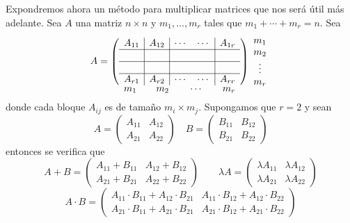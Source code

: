 \begin{obs}
Expondremos ahora un método para multiplicar matrices que nos será útil más adelante. Sea $A$ una matriz $n \times n$ y $m_1, \ldots, m_r$ tales que $m_1+\cdots+m_r=n$. Sea 
$$A=\underset{\mathlarger{\mathlarger{m_1 \qquad m_2 \qquad \cdots \qquad m_r}}}{\left(\begin{array}{c | c | cc | c}
    A_{11} & A_{12} & \cdots & \cdots & A_{1r} \\
    \hline &&&& \\
    \hline &&&&\\
    \hline A_{r1} & A_{r2} & \cdots & \cdots & A_{rr} 
\end{array}\right)}\begin{array}{c}
     m_1  \\
     m_2 \\
     \vdots \\
     m_r
\end{array}$$
donde cada bloque $A_{ij}$ es de tamaño $m_i\times m_j$. Supongamos que $r=2$ y sean 
$$A=\left(\begin{array}{c|c}
   A_{11}  &A_{12}  \\
   \hline
   A_{21}  & A_{22}
\end{array}\right)\quad
B=\left(\begin{array}{c|c}
   B_{11}  &B_{12}  \\
   \hline
   B_{21}  & B_{22}
\end{array}\right)$$
entonces se verifica que 
$$A+B=\left(\begin{array}{c|c}
   A_{11}+B_{11}  &A_{12}+B_{12}  \\
   \hline
   A_{21}+B_{21}  & A_{22}+B_{22}
\end{array}\right) \qquad \lambda A= \left(\begin{array}{c|c}
   \lambda A_{11}  & \lambda A_{12}  \\
   \hline
   \lambda A_{21}  & \lambda A_{22}
\end{array}\right)$$
$$A \cdot B = \left(\begin{array}{c|c}
   A_{11}\cdot B_{11} +A_{12}\cdot B_{21} &A_{11}\cdot B_{12} +A_{12}\cdot B_{22}  \\
   \hline
   A_{21}\cdot B_{11} +A_{21}\cdot B_{21} & A_{21}\cdot B_{12} +A_{21}\cdot B_{22}
\end{array}\right)$$
\end{obs}
